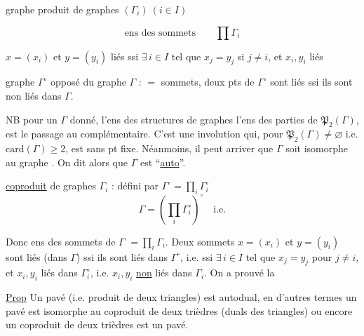 
graphe produit de graphes $(\Gamma_i)\ (i\in I)$

\[
\text{ens des sommets}\qquad\prod\Gamma_i
\]

$x=(x_i)$ et $y=(y_i)$  liés ssi $\exists\,i\in I$ tel que $x_j=y_j$ si $j\ne i$, et $x_i,y_i$ liés

graphe  $\Gamma^\circ$  opposé du graphe $\Gamma$ : $=$ sommets, deux pts  de $\Gamma^\circ$ sont liés ssi ils sont non liés dans $\Gamma$.

NB pour un $\Gamma$ donné, l'ens des structures de  graphes   \inserted{$=$} l'ens des parties de \inserted{$^{\wedge}$} $\mathfrak P_2(\Gamma)$,    est le passage au complémentaire. C'est une involution qui, pour $\mathfrak P_2(\Gamma)\ne\varnothing$ i.e. $\mathrm{card}(\Gamma)\ge 2$, est sans pt fixe. Néanmoins, il peut arriver que $\Gamma$ soit isomorphe au graphe . On dit alors que $\Gamma$ est ``\uline{auto}''.

\uline{coproduit} de graphes $\Gamma_i$ :  défini par $\Gamma^\circ=\prod_i\Gamma_i^\circ$ 
\deleted{$\unsure{\Gamma=}$}
\[
\Gamma=\left(\prod_i\Gamma_i^\circ\right)^\circ\quad\text{i.e.}
\]

Donc ens des sommets de $\Gamma$  $=\prod_i\Gamma_i$. Deux sommets $x=(x_i)$ et $y=(y_i)$  sont  liés (dans $\Gamma$) ssi ils sont  liés dans $\Gamma^\circ$, i.e. ssi $\exists\,i\in I$ tel que $x_j=y_j$ pour $j\ne i$, et $x_i,y_i$  liés dans $\Gamma_i^\circ$, i.e. $x_i,y_i$ \uline{non} liés dans $\Gamma_i$. On a prouvé la


\uline{Prop} Un pavé (i.e.  produit de deux triangles) est autodual, en d'autres termes un pavé est isomorphe au coproduit de deux trièdres (duals des triangles) ou encore un coproduit de deux trièdres est un pavé.

